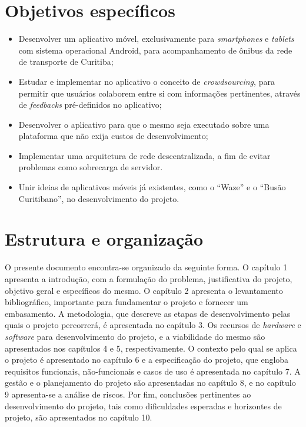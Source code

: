 \section{Objetivos específicos}

\begin{itemize}
\item Desenvolver um aplicativo móvel, exclusivamente para \textit{smartphones} e \textit{tablets} com sistema operacional Android, para acompanhamento de ônibus da rede de transporte de Curitiba;
\item Estudar e implementar no aplicativo o conceito de \textit{crowdsourcing}, para permitir que usuários colaborem entre si com informações pertinentes, através de \textit{feedbacks} pré-definidos no aplicativo;
\item Desenvolver o aplicativo para que o mesmo seja executado sobre uma plataforma que não exija custos de desenvolvimento;
\item Implementar uma arquitetura de rede descentralizada, a fim de evitar problemas como sobrecarga de servidor.
\item Unir ideias de aplicativos móveis já existentes, como o ``Waze'' e o ``Busão Curitibano'', no desenvolvimento do projeto.
\end{itemize}

\section{Estrutura e organização}

O presente documento encontra-se organizado da seguinte forma. O capítulo 1 apresenta a introdução, com a formulação do problema, justificativa do projeto, objetivo geral e específicos do mesmo. O capítulo 2 apresenta o levantamento bibliográfico, importante para fundamentar o projeto e fornecer um embasamento. A metodologia, que descreve as etapas de desenvolvimento pelas quais o projeto percorrerá, é apresentada no capítulo 3. Os recursos de \textit{hardware} e \textit{software} para desenvolvimento do projeto, e a viabilidade do mesmo são apresentados nos capítulos 4 e 5, respectivamente. O contexto pelo qual se aplica o projeto é apresentado no capítulo 6 e a especificação do projeto, que engloba requisitos funcionais, não-funcionais e casos de uso é apresentada no capítulo 7. A gestão e o planejamento do projeto são apresentadas no capítulo 8, e no capítulo 9 apresenta-se a análise de riscos. Por fim, conclusões pertinentes ao desenvolvimento do projeto, tais como dificuldades esperadas e horizontes de projeto, são apresentados no capítulo 10.

